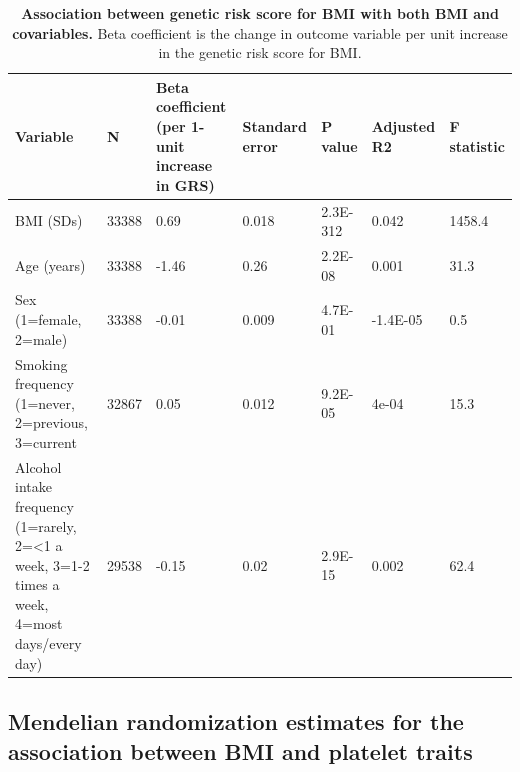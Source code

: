 \documentclass[11pt,twoside]{bristolthesis}
\begin{document}
\begin{landscape}\begin{table}

\caption[Association between genetic risk score for BMI with both BMI and covariables]{\label{tab:INT-GRS-confounders-platelets}\textbf{Association between genetic risk score for BMI with both BMI and covariables.} Beta coefficient is the change in outcome variable per unit increase in the genetic risk score for BMI.}
\centering
\begin{tabu} to 
\toprule
Variable & N & Beta coefficient (per 1-unit increase in GRS) & Standard error & P value & Adjusted R2 & F statistic\\
\midrule
BMI (SDs) & 33388 & 0.69 & 0.018 & 2.3E-312 & 0.042 & 1458.4\\
Age (years) & 33388 & -1.46 & 0.26 & 2.2E-08 & 0.001 & 31.3\\
Sex (1=female, 2=male) & 33388 & -0.01 & 0.009 & 4.7E-01 & -1.4E-05 & 0.5\\
Smoking frequency (1=never, 2=previous, 3=current & 32867 & 0.05 & 0.012 & 9.2E-05 & 4e-04 & 15.3\\
Alcohol intake frequency (1=rarely, 2=<1 a week, 3=1-2 times a week, 4=most days/every day) & 29538 & -0.15 & 0.02 & 2.9E-15 & 0.002 & 62.4\\
\bottomrule
\end{tabu}
\end{table}
\end{landscape}
\hypertarget{mendelian-randomization-estimates-for-the-association-between-bmi-and-platelet-traits}{%
\subsection{Mendelian randomization estimates for the association between BMI and platelet traits}\label{mendelian-randomization-estimates-for-the-association-between-bmi-and-platelet-traits}}
\end{document}
